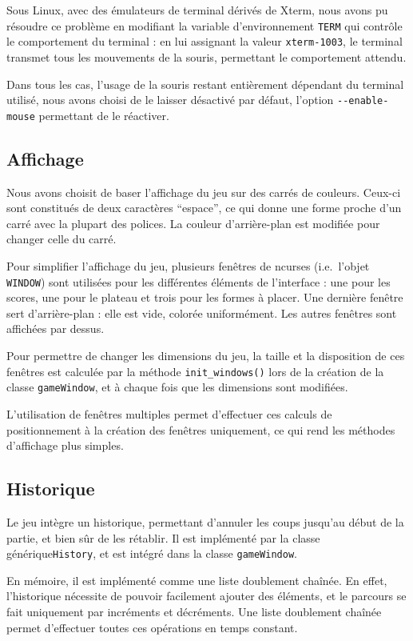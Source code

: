 \documentclass[11pt,a4paper]{article}
\begin{document}
Sous Linux, avec des émulateurs de terminal dérivés de Xterm, nous avons pu résoudre ce problème en modifiant la variable d'environnement \verb"TERM" qui contrôle le comportement du terminal : en lui assignant la valeur \verb"xterm-1003", le terminal transmet tous les mouvements de la souris, permettant le comportement attendu.

Dans tous les cas, l'usage de la souris restant entièrement dépendant du terminal utilisé, nous avons choisi de le laisser désactivé par défaut, l'option \verb"--enable-mouse" permettant de le réactiver.

\subsection{Affichage}
Nous avons choisit de baser l'affichage du jeu sur des carrés de couleurs. Ceux-ci sont constitués de deux caractères ``espace'', ce qui donne une forme proche d'un carré avec la plupart des polices. La couleur d'arrière-plan est modifiée pour changer celle du carré.

Pour simplifier l'affichage du jeu, plusieurs fenêtres de ncurses (i.e.\ l'objet \verb"WINDOW") sont utilisées pour les différentes éléments de l'interface : une pour les scores, une pour le plateau et trois pour les formes à placer. Une dernière fenêtre sert d'arrière-plan : elle est vide, colorée uniformément. Les autres fenêtres sont affichées par dessus.

Pour permettre de changer les dimensions du jeu, la taille et la disposition de ces fenêtres est calculée par la méthode \verb"init_windows()" lors de la création de la classe \verb"gameWindow", et à chaque fois que les dimensions sont modifiées.

L'utilisation de fenêtres multiples permet d'effectuer ces calculs de positionnement à la création des fenêtres uniquement, ce qui rend les méthodes d'affichage plus simples.


\subsection{Historique}
Le jeu intègre un historique, permettant d'annuler les coups jusqu'au début de la partie, et bien sûr de les rétablir. Il est implémenté par la classe générique\verb"History", et est intégré dans la classe \verb"gameWindow".

En mémoire, il est implémenté comme une liste doublement chaînée. En effet, l'historique nécessite de pouvoir facilement ajouter des éléments, et le parcours se fait uniquement par incréments et décréments. Une liste doublement chaînée permet d'effectuer toutes ces opérations en temps constant.
\end{document}
